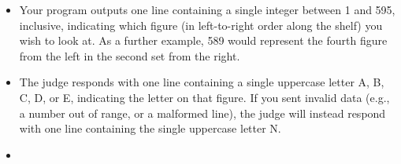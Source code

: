 \documentclass[uplatex,dvipdfmx]{jsarticle} \usepackage{amsmath,amssymb,bm}
\begin{document}
\vspace{\baselineskip}
\begin{paracol}{2}
\begin{itemize}
\item Your program outputs one line containing a single integer between 1 and 595, inclusive, indicating which figure (in left-to-right order along the shelf) you wish to look at. As a further example, 589 would represent the fourth figure from the left in the second set from the right.
\item The judge responds with one line containing a single uppercase letter A, B, C, D, or E, indicating the letter on that figure. If you sent invalid data (e.g., a number out of range, or a malformed line), the judge will instead respond with one line containing the single uppercase letter N.
\end{itemize}
\switchcolumn
\begin{itemize}
\item

\end{itemize}
\end{paracol}





\vspace{\baselineskip}
\begin{paracol}{2}
\switchcolumn
\end{paracol}
\end{document}
